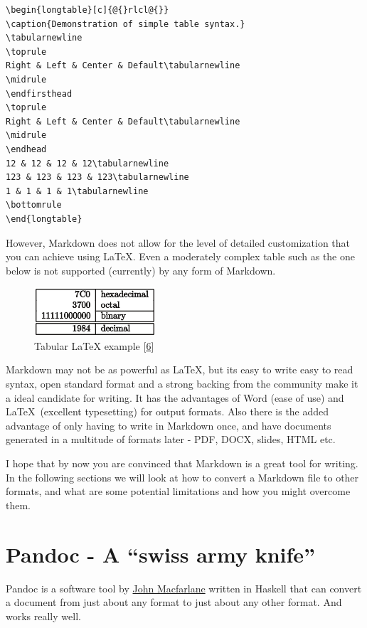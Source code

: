 \documentclass[journal,10pt,final]{IEEEtran}
\begin{document}
\begin{verbatim}
\begin{longtable}[c]{@{}rlcl@{}}
\caption{Demonstration of simple table syntax.}
\tabularnewline
\toprule
Right & Left & Center & Default\tabularnewline
\midrule
\endfirsthead
\toprule
Right & Left & Center & Default\tabularnewline
\midrule
\endhead
12 & 12 & 12 & 12\tabularnewline
123 & 123 & 123 & 123\tabularnewline
1 & 1 & 1 & 1\tabularnewline
\bottomrule
\end{longtable}
\end{verbatim}

However, Markdown does not allow for the level of detailed customization
that you can achieve using \LaTeX. Even a moderately complex table such
as the one below is not supported (currently) by any form of Markdown.

\begin{figure}[htbp]
\centering
\includegraphics{../images/table.png}
\caption{Tabular LaTeX example
{[}\protect\hyperlink{ref-ux5fwikibooks}{6}{]}}
\end{figure}

Markdown may not be as powerful as \LaTeX, but its easy to write easy to
read syntax, open standard format and a strong backing from the
community make it a ideal candidate for writing. It has the advantages
of Word (ease of use) and \LaTeX~(excellent typesetting) for output
formats. Also there is the added advantage of only having to write in
Markdown once, and have documents generated in a multitude of formats
later - PDF, DOCX, slides, HTML etc.

I hope that by now you are convinced that Markdown is a great tool for
writing. In the following sections we will look at how to convert a
Markdown file to other formats, and what are some potential limitations
and how you might overcome them.

\section{\texorpdfstring{Pandoc - A ``swiss army
knife''}{Pandoc - A swiss army knife}}\label{pandoc---a-swiss-army-knife}

Pandoc is a software tool by \href{http://johnmacfarlane.net/}{John
Macfarlane} written in Haskell that can convert a document from just
about any format to just about any other format. And works really well.
\end{document}
